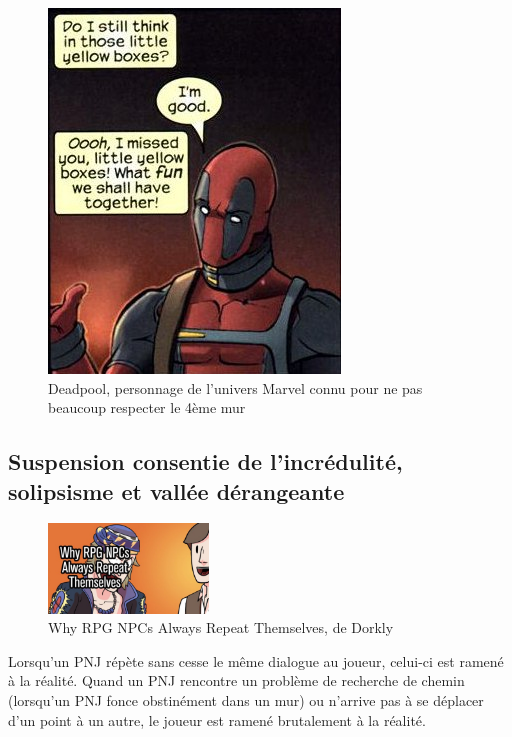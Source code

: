 \documentclass[a4paper, 12pt]{article} %
\begin{document}
\begin{figure}[!h]%
	\begin{center} 
		\includegraphics[width=0.60\columnwidth]{images/deadpool.png}%
		\caption{Deadpool, personnage de l’univers Marvel connu pour ne pas beaucoup respecter le 4ème mur}%
	\end{center}
\end{figure}

\newpage

\subsection{Suspension consentie de l'incrédulité, solipsisme et vallée dérangeante}

\begin{figure}
	\begin{center}
		\includegraphics[width=0.38\textwidth]{images/repeat1.png}
	\end{center}
	\caption{Why RPG NPCs Always Repeat Themselves, de Dorkly}
\end{figure}

Lorsqu’un PNJ répète sans cesse le même dialogue au joueur, celui-ci est ramené à la réalité. Quand un PNJ rencontre un problème de recherche de chemin (lorsqu’un PNJ fonce obstinément dans un mur) ou n’arrive pas à se déplacer d’un point à un autre, le joueur est ramené brutalement à la réalité. 
\end{document}
